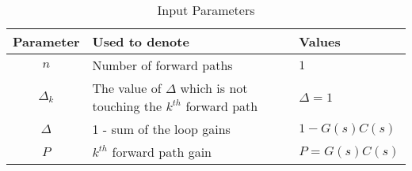 \begin{table}[ht]
\centering
\setlength{\extrarowheight}{8pt}
\caption{Input Parameters}
\begin{tabular}{|c|l|l|} 
\hline
\textbf{Parameter} & \textbf{Used to denote} & \textbf{Values} \\
\hline
$n$ & Number of forward paths & \multicolumn{1}{|p{1.3cm}|}{\centering $1$ }\\
\hline
$\Delta_k$ & The value of $\Delta$ which is not touching the $k^{th} $ forward path & \multicolumn{1}{|p{1.3cm}|}{\centering $\Delta = 1 $ } \\
\hline
$\Delta$ & 1 - sum of the loop gains & \multicolumn{1}{|p{1.3cm}|}{\centering $1-G(s)C(s)$ } \\
\hline
$P$ & $k^{th}$ forward path gain & \multicolumn{1}{|p{1.3cm}|}{\centering $P = G(s)C(s)$ } \\
\hline
\end{tabular}
 \vspace{4mm}
 \label{tab:table0}
\end{table}
